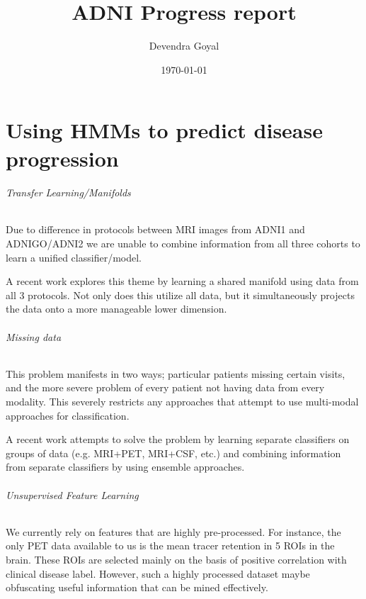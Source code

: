 \documentclass[12pt,a4paper]{article}
\title{ADNI Progress report}
\author{Devendra Goyal}
\date{\today}
\begin{document}
\maketitle

\part{Using HMMs to predict disease progression}

\paragraph{Transfer Learning/Manifolds}

Due to difference in protocols between MRI images from ADNI1 and
ADNIGO/ADNI2 we are unable to combine information from all three
cohorts to learn a unified classifier/model. 

A recent work explores this theme by learning a shared manifold using
data from all 3 protocols. Not only does this utilize all data, but it
simultaneously projects the data onto a more manageable lower
dimension.

\paragraph{Missing data}

This problem manifests in two ways; particular patients missing
certain visits, and the more severe problem of every patient not
having data from every modality. This severely restricts any
approaches that attempt to use multi-modal approaches for
classification.

A recent work attempts to solve the problem by learning separate
classifiers on groups of data (e.g. MRI+PET, MRI+CSF, etc.) and
combining information from separate classifiers by using ensemble
approaches.

\paragraph{Unsupervised Feature Learning}

We currently rely on features that are highly pre-processed. For
instance, the only PET data available to us is the mean tracer
retention in 5 ROIs in the brain. These ROIs are selected mainly on
the basis of positive correlation with clinical disease
label. However, such a highly processed dataset maybe obfuscating
useful information that can be mined effectively.
\end{document}
